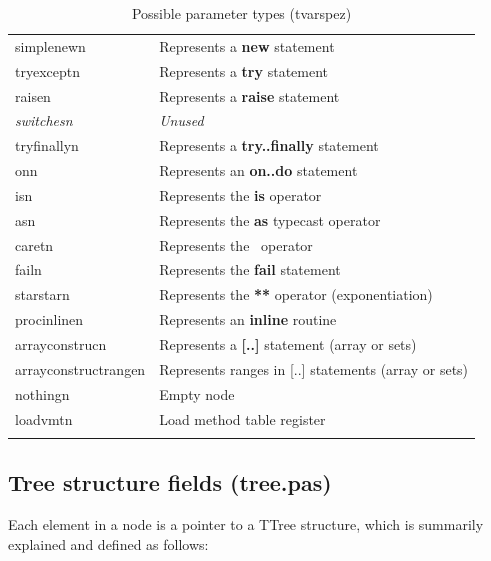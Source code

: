 \documentclass [a4paper,12pt]{article}
\begin{document}
\begin{longtable}{|l|p{10cm}|}
\textsf{simplenewn}&
		\textsf{Represents a }\textsf{\textbf{new}}\textsf{ statement } \\
\textsf{tryexceptn}&
		\textsf{Represents a }\textsf{\textbf{try}}\textsf{ statement} \\
\textsf{raisen}&
		\textsf{Represents a }\textsf{\textbf{raise}}\textsf{ statement} \\
\textsf{\textit{switchesn}}&
		\textsf{\textit{Unused}} \\
\textsf{tryfinallyn}&
		\textsf{Represents a }\textsf{\textbf{try..finally}}\textsf{ statement} \\
\textsf{onn}&
		\textsf{Represents an }\textsf{\textbf{on..do}}\textsf{ statement} \\
\textsf{isn}&
		\textsf{Represents the }\textsf{\textbf{is}}\textsf{ operator} \\
\textsf{asn}&
		\textsf{Represents the }\textsf{\textbf{as}}\textsf{ typecast operator} \\
\textsf{caretn}&
		\textsf{Represents the \  operator} \\
\textsf{failn}&
		\textsf{Represents the }\textsf{\textbf{fail}}\textsf{ statement} \\
\textsf{starstarn}&
		\textsf{Represents the }\textsf{\textbf{**}}\textsf{ operator (exponentiation)} \\
\textsf{procinlinen}&
		\textsf{Represents an }\textsf{\textbf{inline}}\textsf{ routine} \\
\textsf{arrayconstrucn}&
		\textsf{Represents a }\textsf{\textbf{[..]}}\textsf{ statement (array or sets)} \\
\textsf{arrayconstructrangen}&
		\textsf{Represents ranges in [..] statements (array or sets)} \\
\textsf{nothingn}&
		\textsf{Empty node} \\
\textsf{loadvmtn}&
		\textsf{Load method table register} \\
\hline
\caption{Possible parameter types (tvarspez)}
\label{tab6}
\end{longtable}

\subsection{Tree structure fields (tree.pas)}
\label{subsec:mylabel2}

Each element in a node is a pointer to a TTree structure, which is summarily
explained and defined as follows:
\end{document}
